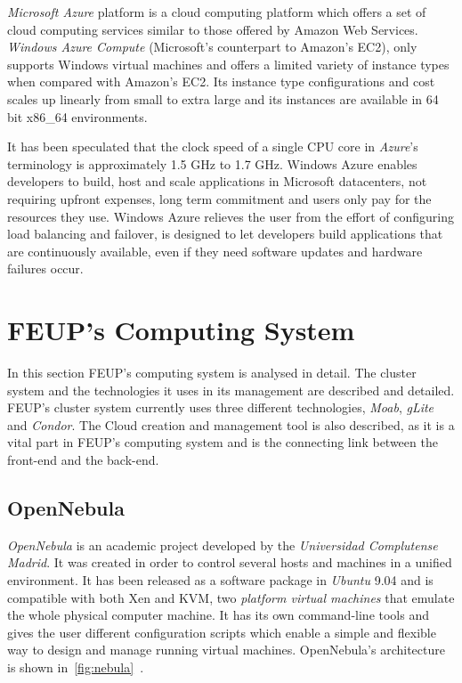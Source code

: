 \textit{Microsoft Azure} platform is a cloud computing platform which offers a set of cloud computing services similar to those offered by Amazon Web Services. \textit{Windows Azure Compute} (Microsoft's counterpart to Amazon's EC2), only supports Windows virtual machines and offers a limited variety of instance types when compared with Amazon's EC2. Its instance type configurations and cost scales up linearly from small to extra large and its instances are available in 64 bit x86\_64 environments. 

It has been speculated that the clock speed of a single CPU core in \textit{Azure}'s terminology is approximately 1.5 GHz to 1.7 GHz.\cite{azure-paper}
Windows Azure enables developers to build, host and scale applications in Microsoft datacenters, not requiring upfront expenses, long term commitment and users only pay for the resources they use. 
Windows Azure relieves the user from the effort of configuring load balancing and failover, is designed to let developers build applications that are continuously available, even if they need software updates and hardware failures occur.\cite{azure}


\section{FEUP's Computing System}\label{feup}

In this section FEUP's computing system is analysed in detail. The cluster system and the technologies it uses in its management are described and detailed. FEUP's cluster system currently uses three different technologies, \textit{Moab}, \textit{gLite} and \textit{Condor}.
The Cloud creation and management tool is also described, as it is a vital part in FEUP's computing system and is the connecting link between the front-end and the back-end.

\subsection{OpenNebula}\label{opennebula}


\textit{OpenNebula} is an academic project developed by the \textit{Universidad Complutense Madrid}. It was created in order to control several hosts and machines in a unified environment. It has been released as a software package in \textit{Ubuntu} 9.04 and is compatible with both Xen and KVM, two \textit{platform virtual machines} that emulate the whole physical computer machine. It has its own command-line tools and gives the user different configuration scripts which enable a simple and flexible way to design and manage running virtual machines. OpenNebula's architecture is shown in~\ref{fig:nebula}~\cite{jorge-ruao}.

